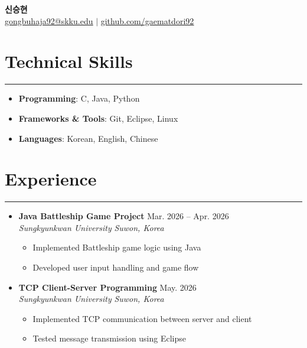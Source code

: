 \documentclass[letterpaper, 10pt]{article}
\begin{document}
\begin{center}
 \textbf{\LARGE 신승현} \\ \vspace{2pt}
 \href{mailto:gongbuhaja92@skku.edu}{\underline{gongbuhaja92@skku.edu}} $|$
 \href{https://github.com/gaematdori92}{\underline{github.com/gaematdori92}}
\end{center}
\section*{Technical Skills}
\hrule
\vspace{4pt}
\begin{itemize}
 \item[] \textbf{Programming}: C, Java, Python%
 \item[] \textbf{Frameworks \& Tools}: Git, Eclipse, Linux%
 \item[] \textbf{Languages}: Korean, English, Chinese%
\end{itemize}
\section*{Experience}
\hrule
\vspace{4pt}
\begin{itemize}
 \item[]
 \textbf{Java Battleship Game Project} \hfill Mar. 2026 -- Apr. 2026 \\ %
 \textit{Sungkyunkwan University} \hfill \textit{Suwon, Korea}
 \begin{itemize}
 \item Implemented Battleship game logic using Java
 \item Developed user input handling and game flow
 \end{itemize}
 \item[]
 \textbf{TCP Client-Server Programming} \hfill May. 2026 \\ %
 \textit{Sungkyunkwan University} \hfill \textit{Suwon, Korea}
 \begin{itemize}
 \item Implemented TCP communication between server and client
 \item Tested message transmission using Eclipse
 \end{itemize}
\end{itemize}
\end{document}
